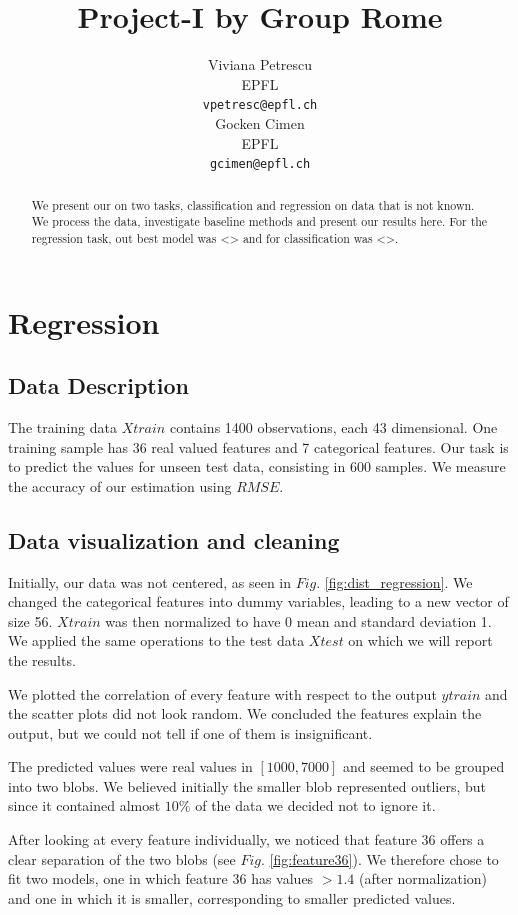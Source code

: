\documentclass{article} %
\title{Project-I by Group Rome}
\author{
Viviana Petrescu\\
EPFL \\
\texttt{vpetresc@epfl.ch} \\
\And
Gocken Cimen\\
EPFL \\
\texttt{gcimen@epfl.ch} \\
}
\begin{document}
\maketitle

\begin{abstract}
We present our on two tasks, classification and regression on data that is not known. We process the data, investigate baseline methods and present our results here.
For the regression task, out best model was <> and for classification was <>.
\end{abstract}

\section{Regression}
\subsection{Data Description}
The training data $Xtrain$ contains 1400 observations, each 43 dimensional. One training sample has 36 real valued features and 7 categorical features. Our task is to predict the values for unseen test data, consisting in 600 samples. We measure the accuracy of our estimation using $RMSE$. 

\subsection{Data visualization and cleaning}
Initially, our data was not centered, as seen in $Fig.$ \ref{fig:dist_regression}.
We changed the categorical features into dummy variables, leading to a new vector of size 56. $Xtrain$ was then normalized to have 0 mean and standard deviation 1. We applied the same operations to the test data $Xtest$ on which we will report the results.

 We plotted the correlation of every feature with respect to the output $ytrain$ and the scatter plots did not look random. We concluded the features explain the output, but we could not tell if one of them is insignificant.

The predicted values were real values in $[1000,7000]$ and seemed to be grouped into two blobs. We believed initially the smaller blob represented outliers, but since it contained almost $10\%$ of the data we decided not to ignore it.

After looking at every feature individually, we noticed that feature 36 offers a clear separation of the two blobs (see $Fig.$ \ref{fig:feature36}). We therefore chose to fit two models, one in which feature 36 has values $>1.4$ (after normalization) and one in which it is smaller, corresponding to smaller predicted values. 
\end{document}
